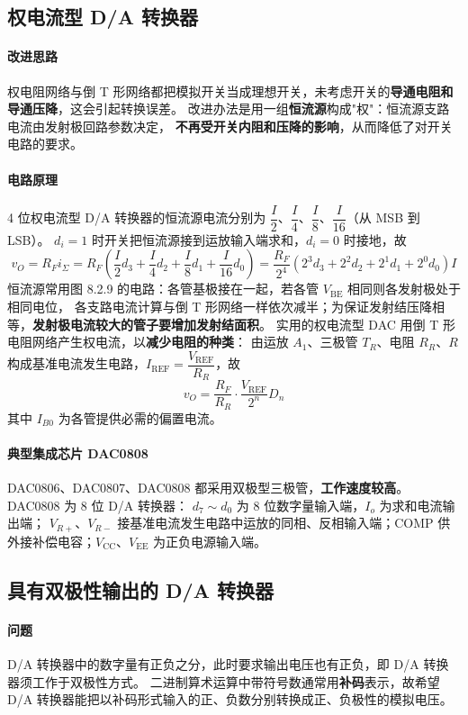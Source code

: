 \subsection{权电流型 D/A 转换器}
\paragraph{改进思路}
权电阻网络与倒 T 形网络都把模拟开关当成理想开关，未考虑开关的\textbf{导通电阻和导通压降}，这会引起转换误差。
改进办法是用一组\textbf{恒流源}构成"权"：恒流源支路电流由发射极回路参数决定，
\textbf{不再受开关内阻和压降的影响}，从而降低了对开关电路的要求。

\paragraph{电路原理}
4 位权电流型 D/A 转换器的恒流源电流分别为 $\dfrac{I}{2}$、$\dfrac{I}{4}$、$\dfrac{I}{8}$、$\dfrac{I}{16}$（从 MSB 到 LSB）。
$d_i=1$ 时开关把恒流源接到运放输入端求和，$d_i=0$ 时接地，故
\[
v_O=R_F i_\Sigma=R_F\left(\frac{I}{2}d_3+\frac{I}{4}d_2+\frac{I}{8}d_1+\frac{I}{16}d_0\right)
=\frac{R_F}{2^4}\left(2^3d_3+2^2d_2+2^1d_1+2^0d_0\right)I
\]
恒流源常用图 8.2.9 的电路：各管基极接在一起，若各管 $V_\text{BE}$ 相同则各发射极处于相同电位，
各支路电流计算与倒 T 形网络一样依次减半；为保证发射结压降相等，\textbf{发射极电流较大的管子要增加发射结面积}。
实用的权电流型 DAC 用倒 T 形电阻网络产生权电流，以\textbf{减少电阻的种类}：
由运放 $A_1$、三极管 $T_R$、电阻 $R_R$、$R$ 构成基准电流发生电路，$I_\text{REF}=\dfrac{V_\text{REF}}{R_R}$，故
\[
v_O=\frac{R_F}{R_R}\cdot\frac{V_\text{REF}}{2^n}D_n
\]
其中 $I_{B0}$ 为各管提供必需的偏置电流。

\paragraph{典型集成芯片 DAC0808}
DAC0806、DAC0807、DAC0808 都采用双极型三极管，\textbf{工作速度较高}。DAC0808 为 8 位 D/A 转换器：
$d_7\sim d_0$ 为 8 位数字量输入端，$I_o$ 为求和电流输出端；
$V_{R+}$、$V_{R-}$ 接基准电流发生电路中运放的同相、反相输入端；COMP 供外接补偿电容；$V_\text{CC}$、$V_\text{EE}$ 为正负电源输入端。

\subsection{具有双极性输出的 D/A 转换器}
\paragraph{问题}
D/A 转换器中的数字量有正负之分，此时要求输出电压也有正负，即 D/A 转换器须工作于双极性方式。
二进制算术运算中带符号数通常用\textbf{补码}表示，故希望 D/A 转换器能把以补码形式输入的正、负数分别转换成正、负极性的模拟电压。

